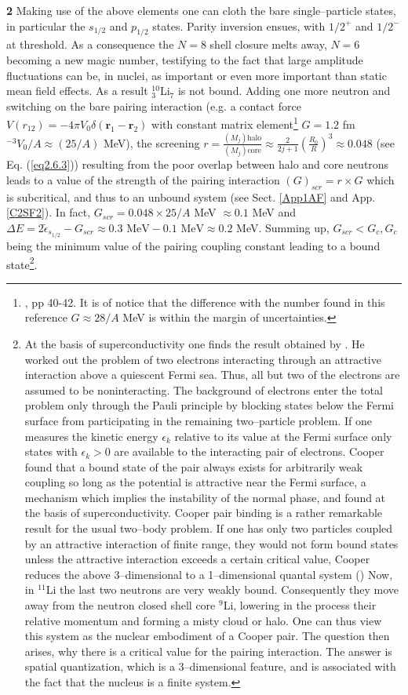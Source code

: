 \textbf{2} Making use of the above elements one can cloth the bare single--particle states, in particular the $s_{1/2}$ and $p_{1/2}$ states. Parity inversion ensues, with $1/2^+$ and $1/2^-$ at threshold. As a consequence the $N=8$ shell closure melts away, $N=6$ becoming a new magic number, testifying to the fact that  large amplitude fluctuations can be, in nuclei, as important or even more important than static mean field effects. As a result $^{10}_3$Li$_7$ is not bound. Adding one more neutron and switching on the bare pairing interaction (e.g. a contact force $V(r_{12})=-4\pi V_0\delta(\mathbf r_1-\mathbf r_2)$ with constant matrix element\footnote{\cite{Brink:05}, pp 40-42. It is of notice that the difference with the number found in this reference $G\approx28/A$ MeV is within the margin of uncertainties.} $G=1.2$ fm$^{-3}V_0/A\approx (25/A)$ MeV), the screening  $r=\frac{(M_j)\text{halo}}{(M_j)\text{core}}\approx \frac{2}{2j+1}\left(\frac{R_0}{R}\right)^3\approx 0.048$ (see Eq. (\ref{eq2.6.3})) resulting from the poor overlap between halo and core neutrons leads to  a value of the strength of the pairing interaction $(G)_{scr}=r\times G$ which is subcritical, and thus to  an unbound system (see Sect. \ref{App1AF} and App. \ref{C2SF2}). In fact, $G_{scr}=0.048\times25/A$ MeV $\approx0.1$ MeV and $\Delta E=2\tilde\epsilon_{s_{1/2}}-G_{scr}\approx0.3\text{ MeV}-0.1\text{ MeV}\approx 0.2$ MeV. Summing up, $G_{scr}<G_c, G_c$ being the minimum value of the pairing coupling constant leading to a bound state\footnote{At the basis of superconductivity one finds the result obtained by \cite{Cooper:56}. He worked out the problem of two electrons interacting through an attractive interaction above a quiescent Fermi sea. Thus, all but two of the electrons are assumed to be noninteracting. The background of electrons enter the total problem only through the Pauli principle by blocking states below the Fermi surface from participating in the remaining two--particle problem. If one measures the kinetic energy $\epsilon_k$ relative to its value at the Fermi surface only states with $\epsilon_k>0$ are available to the interacting pair of electrons. Cooper found that a bound state of the pair always exists for arbitrarily weak coupling so long as the potential is attractive near the Fermi surface, a mechanism which implies the instability of the normal phase, and found at the basis of superconductivity. Cooper pair binding is a rather remarkable result for the usual two--body problem. If one has only two particles coupled by an attractive interaction of finite range, they would not form bound states unless the attractive interaction exceeds a certain critical value, Cooper reduces the above 3--dimensional to a 1--dimensional quantal system (\cite{Gorkov:12}) Now, in $^{11}$Li the last two neutrons are very weakly bound. Consequently they move away from the neutron closed shell core $^9$Li, lowering in the process their relative momentum and forming a misty cloud or halo. One can thus view this system as the nuclear embodiment of a Cooper pair. The question then arises, why there is a critical value for the pairing interaction. The answer is spatial quantization, which is a 3--dimensional feature,  and is associated with the fact that the nucleus is a finite system.}.

